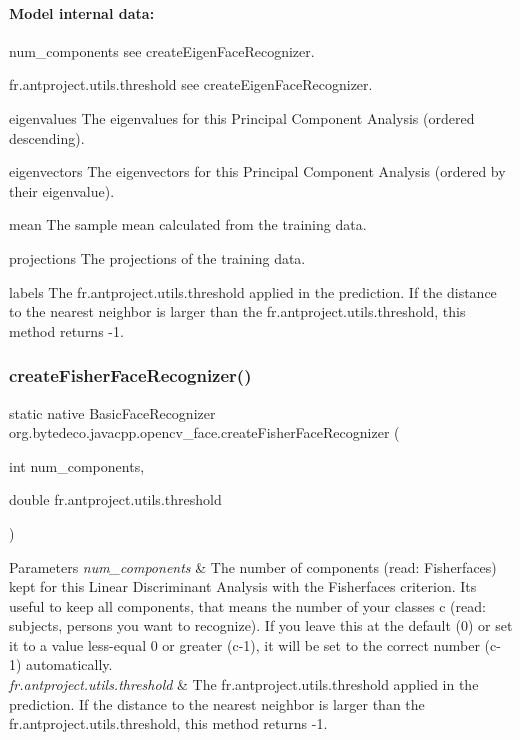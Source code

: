 \paragraph*{Model internal data\+:}


\begin{DoxyItemize}
\item num\+\_\+components see create\+Eigen\+Face\+Recognizer.
\item fr.antproject.utils.threshold see create\+Eigen\+Face\+Recognizer.
\item eigenvalues The eigenvalues for this Principal Component Analysis (ordered descending).
\item eigenvectors The eigenvectors for this Principal Component Analysis (ordered by their eigenvalue).
\item mean The sample mean calculated from the training data.
\item projections The projections of the training data.
\item labels The fr.antproject.utils.threshold applied in the prediction. If the distance to the nearest neighbor is larger than the fr.antproject.utils.threshold, this method returns -\/1.
\end{DoxyItemize}\mbox{\label{group__face_ga80a98f353dd2ef661444e0d79bbe9daf}} 
\subsubsection{\texorpdfstring{create\+Fisher\+Face\+Recognizer()}{createFisherFaceRecognizer()}}
{\footnotesize\ttfamily static native Basic\+Face\+Recognizer org.\+bytedeco.\+javacpp.\+opencv\+\_\+face.\+create\+Fisher\+Face\+Recognizer (\begin{DoxyParamCaption}\item[{int}]{num\+\_\+components,  }\item[{double}]{fr.antproject.utils.threshold }\end{DoxyParamCaption})\hspace{0.3cm}{\ttfamily [static]}}


\begin{DoxyParams}{Parameters}
{\em num\+\_\+components} & The number of components (read\+: Fisherfaces) kept for this Linear Discriminant Analysis with the Fisherfaces criterion. It\textquotesingle{}s useful to keep all components, that means the number of your classes c (read\+: subjects, persons you want to recognize). If you leave this at the default (0) or set it to a value less-\/equal 0 or greater (c-\/1), it will be set to the correct number (c-\/1) automatically. \\
\hline
{\em fr.antproject.utils.threshold} & The fr.antproject.utils.threshold applied in the prediction. If the distance to the nearest neighbor is larger than the fr.antproject.utils.threshold, this method returns -\/1. \\
\hline
\end{DoxyParams}
